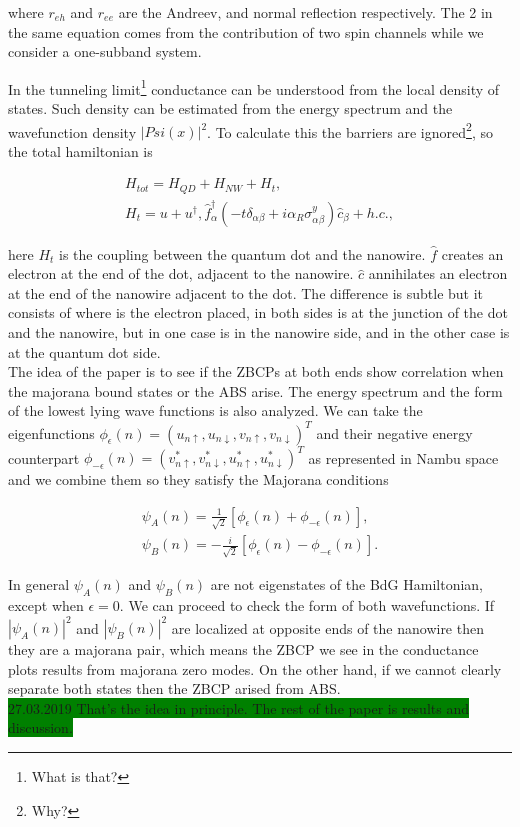 where $r_{eh}$ and $r_{ee}$ are the Andreev, and normal reflection respectively. The 2 in the same equation comes from the contribution of two spin channels while we consider a one-subband system.

In the tunneling limit\footnote{What is that?} conductance can be understood from the local density of states. Such density can be estimated from the energy spectrum and the wavefunction density $|Psi(x)|^2$. To calculate this the barriers are ignored\footnote{Why?}, so the total hamiltonian is

\begin{equation}
    \begin{aligned}
        H_{tot} = H_{QD} + H_{NW} + H_{t},\\
        H_t = u + u^\dagger, \hat{f}_\alpha^\dagger\left(-t\delta_{\alpha\beta} + i\alpha_R \sigma_{\alpha\beta}^y\right)\hat{c}_\beta + h.c.,
    \end{aligned}
\end{equation}

here $H_t$ is the coupling between the quantum dot and the nanowire. $\hat{f}$ creates an electron at the end of the dot, adjacent to the nanowire. $\hat{c}$ annihilates an electron at the end of the nanowire adjacent to the dot. The difference is subtle but it consists of where is the electron placed, in both sides is at the junction of the dot and the nanowire, but in one case is in the nanowire side, and in the other case is at the quantum dot side.\\

The idea of the paper is to see if the ZBCPs at both ends show correlation when the majorana bound states or the ABS arise. The energy spectrum and the form of the lowest lying wave functions is also analyzed. We can take the eigenfunctions $\phi_\epsilon(n) = (u_{n\uparrow},u_{n\downarrow},v_{n\uparrow},v_{n\downarrow})^T$ and their negative energy counterpart $\phi_{-\epsilon}(n) = (v_{n\uparrow}^*,v_{n\downarrow}^*,u_{n\uparrow}^*,u_{n\downarrow}^*)^T$ as represented in Nambu space and we combine them so they satisfy the Majorana conditions

\begin{eqnarray}
    \psi_A(n) =\frac{1}{\sqrt{2}}[\phi_\epsilon(n) + \phi_{-\epsilon}(n)],\\
    \psi_B(n) =-\frac{i}{\sqrt{2}}[\phi_\epsilon(n) - \phi_{-\epsilon}(n)].
\end{eqnarray}

In general $\psi_A(n)$ and $\psi_B(n)$ are not eigenstates of the BdG Hamiltonian, except when $\epsilon = 0$. We can proceed to check the form of both wavefunctions. If $|\psi_A(n)|^2$ and $|\psi_B(n)|^2$ are localized at opposite ends of the nanowire then they are a majorana pair, which means the ZBCP we see in the conductance plots results from majorana zero modes. On the other hand, if we cannot clearly separate both states then the ZBCP arised from ABS.\\


\colorbox{green}{27.03.2019 That's the idea in principle. The rest of the paper is results and discussion.}
